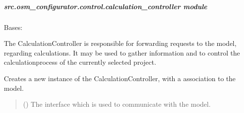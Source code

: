 \documentclass[letterpaper,10pt,english]{sphinxmanual}
\begin{document}
\subparagraph{src.osm\_configurator.control.calculation\_controller module}
\label{\detokenize{apidoc/src.osm_configurator.control:module-src.osm_configurator.control.calculation_controller}}\label{\detokenize{apidoc/src.osm_configurator.control:src-osm-configurator-control-calculation-controller-module}}

\begin{fulllineitems}
\label{\detokenize{apidoc/src.osm_configurator.control:src.osm_configurator.control.calculation_controller.CalculationController}}
\pysigstartsignatures
{}
\pysigstopsignatures
\sphinxAtStartPar
Bases: 

\sphinxAtStartPar
The CalculationController is responsible for forwarding requests to the model, regarding calculations.
It may be used to gather information and to control the calculation\sphinxhyphen{}process of the currently selected project.

\begin{fulllineitems}
\label{\detokenize{apidoc/src.osm_configurator.control:src.osm_configurator.control.calculation_controller.CalculationController.__init__}}
\pysigstartsignatures
{}
\pysigstopsignatures
\sphinxAtStartPar
Creates a new instance of the CalculationController, with a association to the model.
\begin{quote}\begin{description}
\sphinxAtStartPar
{} ({\hyperref[\detokenize{apidoc/src.osm_configurator.model.application:src.osm_configurator.model.application.application_interface.IApplication}]{}}) \textendash{} The interface which is used to communicate with the model.


\end{description}
\end{quote}
\end{fulllineitems}
\end{fulllineitems}
\end{document}
